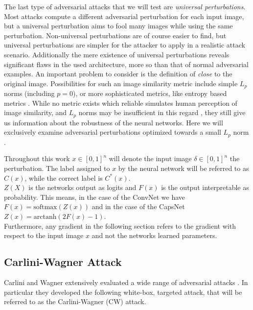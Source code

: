 The last type of adversarial attacks that we will test are \emph{universal perturbations}. Most attacks compute a different adversarial perturbation for each input image, but a universal perturbation aims to fool many images while using the same perturbation.
Non-universal perturbations are of course easier to find, but universal perturbations are simpler for the attacker to apply in a realistic attack scenario. Additionally the mere existence of universal perturbations reveals significant flaws in the used architecture, more so than that of normal adversarial examples. 
An important problem to consider is the definition of \emph{close} to the original image. Possibilities for such an image similarity metric include simple $L_p$ norms (including $p=0$),
or more sophisticated metrics, like entropy based metrics .
While no metric exists which reliable simulates human perception of image similarity, and $L_p$ norms may be insufficient in this regard \cite{lpnorms}, they still give us information about the robustness of the neural networks. Here we will exclusively examine adversarial perturbations optimized towards a small $L_p$ norm .

Throughout this work $x \in [0,1]^n$ will denote the input image $\delta \in [0,1]^n$ the perturbation.
The label assigned to $x$ by the neural network will be referred to as $C(x)$, while the correct label is $C^*(x)$.\\
$Z(X)$ is the networks output as logits and $F(x)$ is the output interpretable as probability.
This means, in the case of the ConvNet we have $F(x) = \mathrm{softmax}(Z(x))$ and in the case of the CapsNet $Z(x) = \mathrm{arctanh}(2F(x) - 1)$. \\
Furthermore, any gradient in the following section refers to the gradient with respect to the input image $x$ and not the networks learned parameters.



\subsection{Carlini-Wagner Attack}

Carlini and Wagner extensively evaluated a wide range of adversarial attacks \cite{carlini}.
In particular they developed the following white-box, targeted attack, that will be referred to as the Carlini-Wagner (CW) attack.

